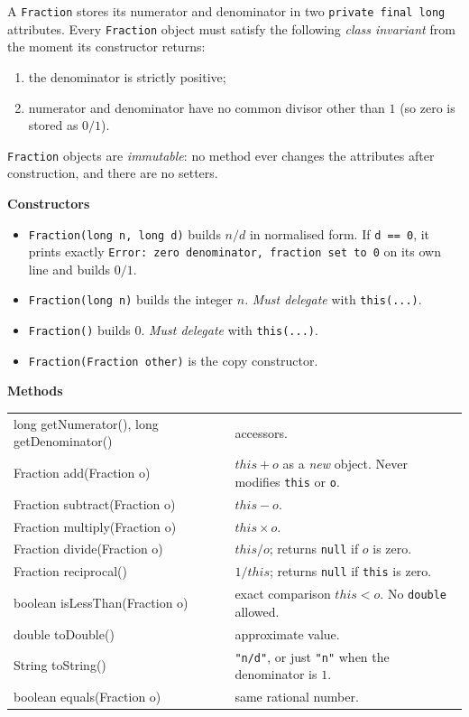 \documentclass[11pt,a4paper]{article}
\newcommand{\code}[1]{\lstinline[basicstyle=\ttfamily\normalsize,basewidth=0.5em]{#1}}
\newcommand{\spec}[1]{\par\smallskip\textbf{#1}\par}
\begin{document}
A \code{Fraction} stores its numerator and denominator in two
\code{private final long} attributes. Every \code{Fraction} object must
satisfy the following \emph{class invariant} from the moment its constructor
returns:
\begin{enumerate}[label=(I\arabic*), itemsep=0pt]
  \item the denominator is strictly positive;
  \item numerator and denominator have no common divisor other than $1$
        (so zero is stored as $0/1$).
\end{enumerate}
\code{Fraction} objects are \emph{immutable}: no method ever changes the
attributes after construction, and there are no setters.

\spec{Constructors}
\begin{itemize}[itemsep=2pt]
  \item \code{Fraction(long n, long d)} builds $n/d$ in normalised form. If
        \code{d == 0}, it prints exactly
        \code{Error: zero denominator, fraction set to 0} on its own line and builds $0/1$.
  \item \code{Fraction(long n)} builds the integer $n$. \emph{Must delegate} with \code{this(...)}.
  \item \code{Fraction()} builds $0$. \emph{Must delegate} with \code{this(...)}.
  \item \code{Fraction(Fraction other)} is the copy constructor.
\end{itemize}

\spec{Methods}

\begin{tabular}{@{}S{0.40\textwidth} D{0.55\textwidth}@{}}
long getNumerator(), long getDenominator() & accessors. \\
Fraction add(Fraction o) & $\mathit{this} + o$ as a \emph{new} object. Never modifies \code{this} or \code{o}. \\
Fraction subtract(Fraction o) & $\mathit{this} - o$. \\
Fraction multiply(Fraction o) & $\mathit{this} \times o$. \\
Fraction divide(Fraction o) & $\mathit{this} / o$; returns \code{null} if $o$ is zero. \\
Fraction reciprocal() & $1/\mathit{this}$; returns \code{null} if \code{this} is zero. \\
boolean isLessThan(Fraction o) & exact comparison $\mathit{this} < o$. No \code{double} allowed. \\
double toDouble() & approximate value. \\
String toString() & \code{"n/d"}, or just \code{"n"} when the denominator is $1$. \\
boolean equals(Fraction o) & same rational number. \\
\end{tabular}
\end{document}
